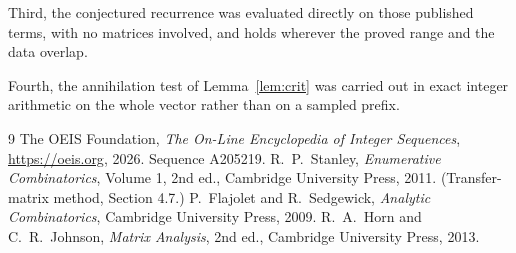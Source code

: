 \documentclass[11pt,a4paper]{article}
\theoremstyle{plain}
\theoremstyle{definition}
\begin{document}
Third, the conjectured recurrence was evaluated directly on those published terms, with no
matrices involved, and holds wherever the proved range and the data overlap.

Fourth, the annihilation test of Lemma~\ref{lem:crit} was carried out in exact integer
arithmetic on the whole vector rather than on a sampled prefix.

\begin{thebibliography}{9}
 The OEIS Foundation, \emph{The On-Line Encyclopedia of Integer
Sequences}, \url{https://oeis.org}, 2026. Sequence A205219.
 R.~P.~Stanley, \emph{Enumerative Combinatorics}, Volume 1, 2nd ed.,
Cambridge University Press, 2011. (Transfer-matrix method, Section 4.7.)
 P.~Flajolet and R.~Sedgewick, \emph{Analytic Combinatorics}, Cambridge
University Press, 2009.
 R.~A.~Horn and C.~R.~Johnson, \emph{Matrix Analysis}, 2nd ed., Cambridge
University Press, 2013.
\end{thebibliography}
\end{document}
